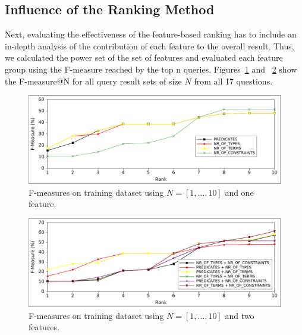 \subsection{Influence of the Ranking Method}
Next, evaluating the effectiveness of the feature-based ranking has to include an in-depth analysis of the contribution of each feature to the overall result.
Thus, we calculated the power set of the set of features and evaluated each feature group using the F-measure reached by the top n queries. 
Figures~\ref{chahawk:fig:ranking_1} and ~\ref{chahawk:fig:ranking_2} show the F-measure@N for all query result sets of size $N$ from all 17 questions. 
\begin{figure}[htb!]
\includegraphics[width=\linewidth]{part_03/ESWC_HAWK/onefeature}
\caption{F-measures on training dataset using $N=[1,\ldots,10]$ and one feature.}
\label{chahawk:fig:ranking_1}
\end{figure}
\begin{figure}[htb!]
\includegraphics[width=\linewidth]{part_03/ESWC_HAWK/twofeature}
\caption{F-measures on training dataset using $N=[1,\ldots,10]$ and two features.}
\label{chahawk:fig:ranking_2}
\end{figure}

